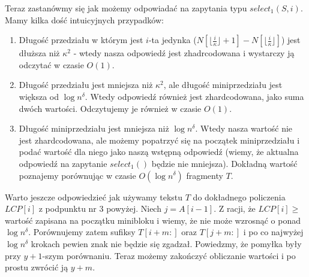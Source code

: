 \documentclass{article}
\begin{document}




Teraz zastanówmy się jak możemy odpowiadać na zapytania typu $select_1(S, i)$. Mamy kilka dość intuicyjnych przypadków:

\begin{enumerate}
    \item Długość przedziału w którym jest $i$-ta jedynka ($N[\lfloor \frac{i}{\kappa} \rfloor + 1] - N[\lfloor \frac{i}{\kappa} \rfloor]$) jest dłuższa niż $\kappa^2$ - wtedy nasza odpowiedź jest zhadrcodowana i wystarczy ją odczytać w czasie $O(1)$.
    \item Długość przedziału jest mniejsza niż $\kappa^2$, ale długość miniprzedziału jest większa od $\log{n}^{\delta}$. Wtedy odpowiedź również jest zhardcodowana, jako suma dwóch wartości. Odczytujemy je również w czasie $O(1)$.
    \item Długość miniprzedziału jest mniejsza niż $\log{n}^{\delta}$. Wtedy nasza wartość nie jest zhardcodowana, ale możemy popatrzyć się na początek miniprzedziału i podać wartość dla niego jako naszą wstępną odpowiedź (wiemy, że aktualna odpowiedź na zapytanie $select_1()$ będzie nie mniejsza). Dokładną wartość poznajemy porównując w czasie $O(\log{n}^{\delta})$ fragmenty $T$.
\end{enumerate}

Warto jeszcze odpowiedzieć jak używamy tekstu $T$ do dokładnego policzenia $LCP[i]$ z podpunktu nr 3 powyżej. Niech $j = A[i-1]$. Z racji, że $LCP[i] \ge$ wartość zapisana na początku minibloku i wiemy, że nie może wzrosnąć o ponad $\log{n}^{\delta}$. Porównujemy zatem sufiksy $T[i+m:]$ oraz $T[j+m:]$ i po co najwyżej $\log{n}^{\delta}$ krokach pewien znak nie będzie się zgadzał. Powiedzmy, że pomyłka były przy $y+1$-szym porównaniu. Teraz możemy zakończyć obliczanie wartości i po prostu zwrócić ją $y+m$.
\end{document}

